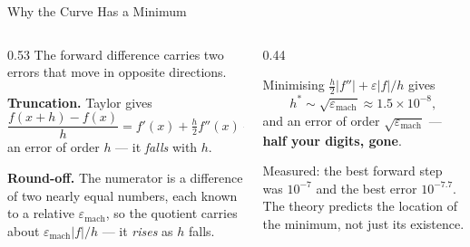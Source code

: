 \begin{frame}{Why the Curve Has a Minimum}
\begin{columns}[T]
\begin{column}{0.53\textwidth}
\small
The forward difference carries two errors that move in opposite directions.
\medskip

\textbf{Truncation.} Taylor gives
\[
  \frac{f(x+h)-f(x)}{h}=f'(x)+\tfrac{h}{2}f''(x)+O(h^{2}),
\]
an error of order $h$ --- it \emph{falls} with $h$.
\medskip

\textbf{Round-off.} The numerator is a difference of two nearly equal numbers, each known to a relative $\varepsilon_{\text{mach}}$, so the quotient carries about $\varepsilon_{\text{mach}}|f|/h$ --- it \emph{rises} as $h$ falls.
\end{column}
\begin{column}{0.44\textwidth}
\begin{conceptbox}[title=\textbf{Balance them}]\small
Minimising $\tfrac h2|f''|+\varepsilon|f|/h$ gives
\[
  h^{*}\sim\sqrt{\varepsilon_{\text{mach}}}\approx1.5\times10^{-8},
\]
and an error of order $\sqrt{\varepsilon_{\text{mach}}}$ --- \textbf{half your digits, gone}.
\end{conceptbox}
\medskip
\begin{takeawaybox}\footnotesize
Measured: the best forward step was $10^{-7}$ and the best error $10^{-7.7}$. The theory predicts the location of the minimum, not just its existence.
\end{takeawaybox}
\end{column}
\end{columns}
\vspace{1mm}
\end{frame}

